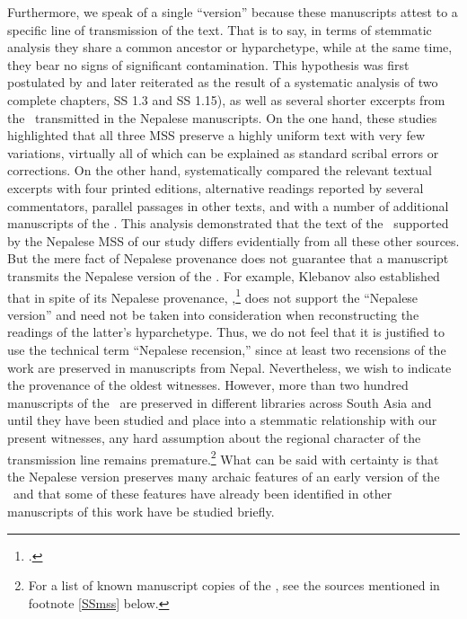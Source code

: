 Furthermore, we speak of a single “version” because these manuscripts attest to a
specific line of transmission of the text.  That is to say, in terms of stemmatic
analysis they share a common ancestor or hyparchetype, while at the same time,
they bear no signs of significant contamination.  This hypothesis was first
postulated by \citet{kleb-2010} and later reiterated \citet{kleb-2021a} as the
result of a systematic analysis of two complete chapters, SS 1.3 and SS 1.15), as
well as several shorter excerpts from the \SS\ transmitted in the Nepalese
manuscripts. On the one hand, these studies highlighted that all three MSS
preserve a highly uniform text with very few variations, virtually all of which
can be explained as standard scribal errors or corrections. On the other hand,
\citet{kleb-2010,kleb-2021a} systematically compared the relevant textual excerpts
with four printed editions, alternative readings reported by several commentators,
parallel passages in other texts, and with a number of additional manuscripts of
the \SS. This analysis demonstrated that the text of the \SS\ supported by the
Nepalese MSS of our study differs evidentially from all these other sources. But
the mere fact of Nepalese provenance does not guarantee that a manuscript
transmits the Nepalese version of the \SS.  For example, Klebanov also established
that in spite of its Nepalese provenance, ,\footcite{rima-2022} does not support the “Nepalese version” and need not
be taken into consideration when reconstructing the readings of the latter's
hyparchetype.  Thus, we do not feel that it is justified to use the technical term
“Nepalese recension,” since at least two recensions of the work are preserved in
manuscripts from Nepal.  Nevertheless, we wish to indicate the provenance of the
oldest witnesses. However, more than two hundred manuscripts of the \SS\ are
preserved in different libraries across South Asia and until they have been
studied and place into a stemmatic relationship with our present witnesses, any
hard assumption about the regional character of the transmission line remains
premature.\footnote{For a list of known manuscript copies of the \SS, see the
    sources mentioned in footnote \ref{SSmss} below.} What can be said with certainty
    is that the Nepalese version preserves many archaic features of an early version
    of the \SS\ and that some of these features have already been identified in other
    manuscripts of this work have be studied briefly.%

